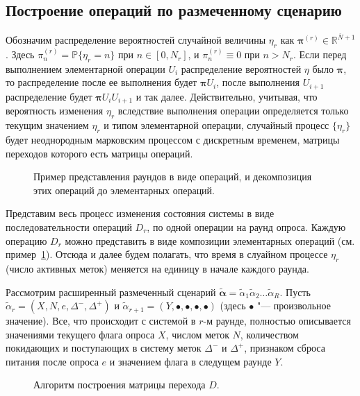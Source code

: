 \subsection{Построение операций по размеченному сценарию}\label{subsec:ch3_bg_op_composition}
Обозначим распределение вероятностей случайной величины $\eta_r$ как $\bm{\pi}^{(r)} \in \mathbb{R}^{\overline{N}+1}$. Здесь $\pi_n^{(r)} = \mathbb{P}\{\eta_r = n \}$ при $n \in [0, N_r]$, и $\pi_n^{(r)} \equiv 0$ при $n > N_r$. Если перед выполнением элементарной операции $U_i$ распределение вероятностей $\eta$ было $\bm{\pi}$, то распределение после ее выполнения будет $\bm{\pi}U_i$, после выполнения $U_{i+1}$ распределение будет $\bm{\pi} U_i U_{i+1}$ и так далее. Действительно, учитывая, что вероятность изменения $\eta_r$ вследствие выполнения операции определяется только текущим значением $\eta_r$ и типом элементарной операции, случайный процесс $\{ \eta_r \}$ будет неоднородным марковским процессом с дискретным временем, матрицы переходов которого есть матрицы операций.

\begin{figure}[htb]
  \caption{Пример представления раундов в виде операций, и декомпозиция этих операций до элементарных операций.}
  \label{fig:ch3_decomposition}
\end{figure}

Представим весь процесс изменения состояния системы в виде последовательности операций $D_r$, по одной операции на раунд опроса. Каждую операцию $D_r$ можно представить в виде композиции элементарных операций (см. пример~\ref{fig:ch3_decomposition}). Отсюда и далее будем полагать, что время в слуайном процессе $\eta_r$ (число активных меток) меняется на единицу в начале каждого раунда.

Рассмотрим расширенный размеченный сценарий $\widetilde{\bm{\alpha}} = \widetilde{\alpha}_1 \widetilde{\alpha}_2 \dots \widetilde{\alpha}_R$. Пусть $\widetilde{\alpha}_r = (X, N, e, \Delta^-, \Delta^+)$ и $\widetilde{\alpha}_{r+1} = (Y, \bullet, \bullet, \bullet, \bullet)$ (здесь $\bullet$ "--- произвольное значение). Все, что происходит с системой в $r$-м раунде, полностью описывается значениями текущего флага опроса $X$, числом меток $N$, количеством покидающих и поступающих в систему меток $\Delta^-$ и $\Delta^+$, признаком сброса питания после опроса $e$ и значением флага в следущем раунде $Y$.

\begin{figure}[htb]
  \caption{Алгоритм построения матрицы перехода $D$.}
  \label{fig:ch3_matrix_composition}
\end{figure}

